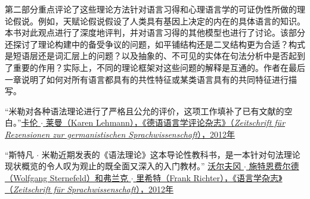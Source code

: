 {第二部分重点评论了这些理论方法针对语言习得和心理语言学的可证伪性所做的理论假说。例如，天赋论假说假设了人类具有基因上决定的内在的具体语言的知识。本书对此观点进行了深度地评判，并对语言习得的其他模型也进行了讨论。该部分还探讨了理论构建中的备受争议的问题，如平铺结构还是二叉结构更为合适？构式是短语层还是词汇层上的问题？以及抽象的、不可见的实体在句法分析中是否起到了重要的作用？实际上，不同的理论框架对这些问题的解释是互通的。作者在最后一章说明了如何对所有语言都具有的共性特征或某类语言具有的共同特征进行描写。

\smallskip

\vfill

“米勒对各种语法理论进行了严格且公允的评价，这项工作填补了已有文献的空白。”\href{http://dx.doi.org/10.1515/zrs-2012-0040}{卡伦 $\cdot$ 莱曼（Karen Lehmann），《德语语言学评论杂志》（\textit{Zeitschrift für Rezensionen zur germanistischen Sprachwissenschaft}），2012年}


\smallskip

“斯特凡 $\cdot$ 米勒近期发表的《语法理论》这本导论性教科书，是一本针对句法理论现状概览的令人叹为观止的既全面又深入的入门教材。” \href{http://dx.doi.org/10.1515/zfs-2012-0010}{沃尔夫冈 $\cdot$ 施特恩费尔德（Wolfgang Sternefeld）和弗兰克 $\cdot$ 里希特（Frank Richter），《语言学杂志》（\textit{Zeitschrift für Sprachwissenschaft}），2012年}


}
